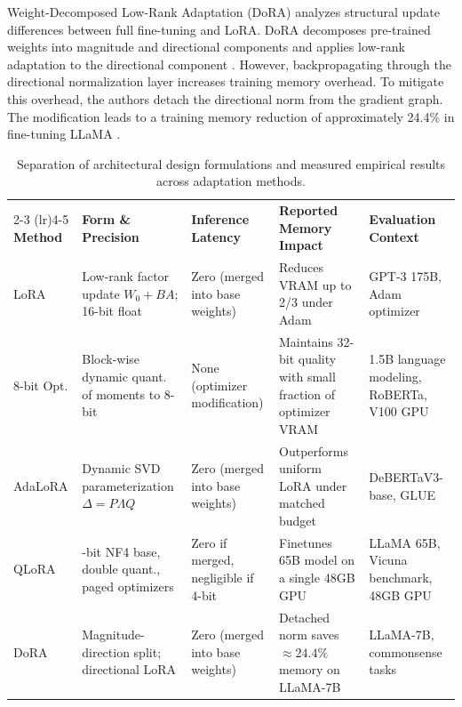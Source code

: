 \documentclass[11pt,a4paper]{article}
\begin{document}
Weight-Decomposed Low-Rank Adaptation (DoRA) analyzes structural update differences between full fine-tuning and LoRA. DoRA decomposes pre-trained weights into magnitude and directional components and applies low-rank adaptation to the directional component \cite{liu2024dora}. However, backpropagating through the directional normalization layer increases training memory overhead. To mitigate this overhead, the authors detach the directional norm from the gradient graph. The modification leads to a training memory reduction of approximately 24.4\% in fine-tuning LLaMA \cite{liu2024dora}.

\begin{table}[t]
\centering
\small
\caption{Separation of architectural design formulations and measured empirical results across adaptation methods.}
\label{tab:comparison}
\begin{tabularx}{\textwidth}{l >{\raggedright\arraybackslash}p{2.3cm} >{\raggedright\arraybackslash}p{1.7cm} >{\raggedright\arraybackslash}X >{\raggedright\arraybackslash}p{2.8cm}}
\toprule
& \multicolumn{2}{c}{\textbf{Architectural Design Choices}} & \multicolumn{2}{c}{\textbf{Reported Measured Results}} \\
\cmidrule(lr){2-3} \cmidrule(lr){4-5}
\textbf{Method} & \textbf{Form \& Precision} & \textbf{Inference Latency} & \textbf{Reported Memory Impact} & \textbf{Evaluation Context} \\
\midrule
LoRA \cite{hu2021lora} & Low-rank factor update $W_0 + BA$; 16-bit float & Zero (merged into base weights) & Reduces VRAM up to 2/3 under Adam & GPT-3 175B, Adam optimizer \\
8-bit Opt. \cite{dettmers20218} & Block-wise dynamic quant. of moments to 8-bit & None (optimizer modification) & Maintains 32-bit quality with small fraction of optimizer VRAM & 1.5B language modeling, RoBERTa, V100 GPU \\
AdaLoRA \cite{zhang2023adalora} & Dynamic SVD parameterization $\Delta = P \Lambda Q$ & Zero (merged into base weights) & Outperforms uniform LoRA under matched budget & DeBERTaV3-base, GLUE \\
QLoRA \cite{dettmers2023qlora} & 4-bit NF4 base, double quant., paged optimizers & Zero if merged, negligible if 4-bit & Finetunes 65B model on a single 48GB GPU & LLaMA 65B, Vicuna benchmark, 48GB GPU \\
DoRA \cite{liu2024dora} & Magnitude-direction split; directional LoRA & Zero (merged into base weights) & Detached norm saves $\approx 24.4\%$ memory on LLaMA-7B & LLaMA-7B, commonsense tasks \\
\bottomrule
\end{tabularx}
\end{table}
\end{document}
